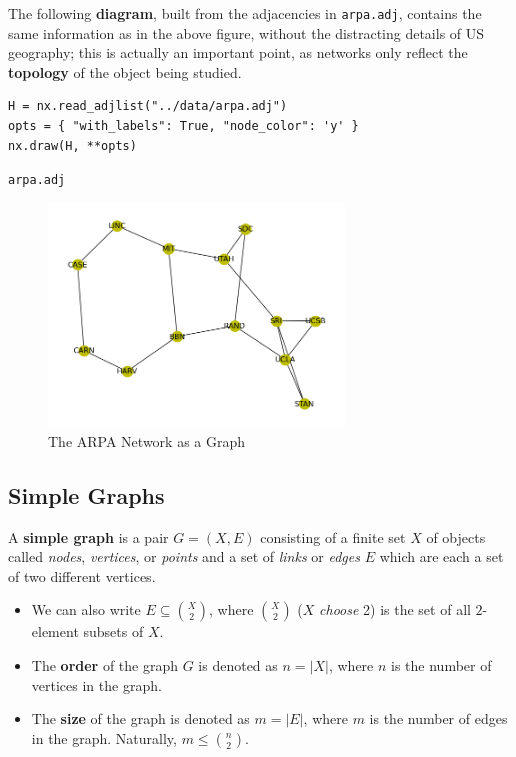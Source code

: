 \documentclass[a4paper,11pt]{article}
\newenvironment{code}{\captionsetup{type=listing}}{}
\begin{document}
The following \textbf{diagram}, built from the adjacencies in \verb|arpa.adj|, contains the same information as in the above figure, without the distracting details of US geography;
this is actually an important point, as networks only reflect the \textbf{topology} of the object being studied.

\begin{code}
\begin{verbatim}
H = nx.read_adjlist("../data/arpa.adj")
opts = { "with_labels": True, "node_color": 'y' }
nx.draw(H, **opts)
\end{verbatim}
\caption{\texttt{arpa.adj}}
\end{code}

\begin{figure}[H]
    \centering
    \includegraphics[width=0.7\textwidth]{./images/qwe_download.png}
    \caption{ The ARPA Network as a Graph }
\end{figure}

\subsection{Simple Graphs}
A \textbf{simple graph} is a pair $G = (X,E)$ consisting of a finite set $X$ of objects called \textit{nodes}, \textit{vertices}, or \textit{points} and a set of \textit{links} or \textit{edges} $E$ which are each a set of two different vertices. 
\begin{itemize}
    \item   We can also write $E \subseteq \binom{X}{2}$, where $\binom{X}{2}$ ($X$ \textit{choose} 2) is the set of all $2$-element subsets of $X$.
    \item   The \textbf{order} of the graph $G$ is denoted as $n = |X|$, where $n$ is the number of vertices in the graph.
    \item   The \textbf{size} of the graph is denoted as $m = |E|$, where $m$ is the number of edges in the graph.
            Naturally, $m \leq \binom{n}{2}$.
\end{itemize}
\end{document}
